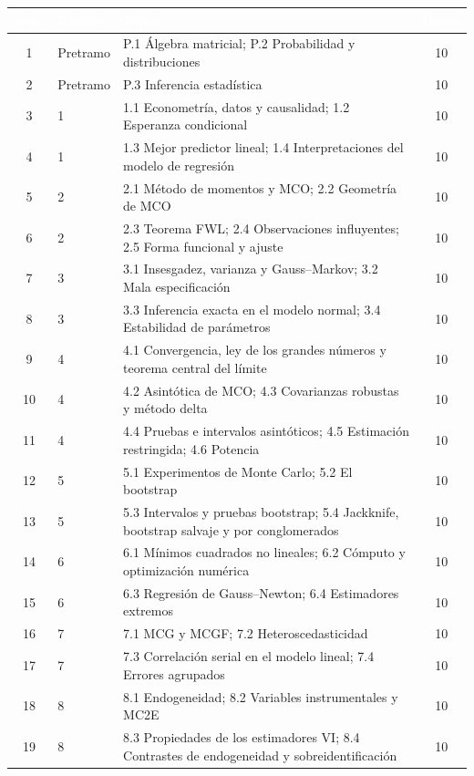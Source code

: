 \documentclass[11pt,a4paper]{article}
\renewcommand{\arraystretch}{1.3}
\newcommand{\cab}[1]{\textcolor{white}{\sffamily\bfseries #1}}
\newcommand{\filasalternas}{\rowcolors{2}{white}{tonoPalido}}
\begin{document}
{\small\filasalternas
\renewcommand{\arraystretch}{1.1}\noindent\begin{tabularx}{\textwidth}{clXc}
\toprule
\rowcolor{tonoOscuro}\cab{Sem.} & \cab{Bloque} & \cab{Temas} & \cab{Horas} \\
\midrule
1  & Pretramo & P.1 Álgebra matricial; P.2 Probabilidad y distribuciones & 10 \\
2  & Pretramo & P.3 Inferencia estadística & 10 \\
\midrule
3  & 1 & 1.1 Econometría, datos y causalidad; 1.2 Esperanza condicional & 10 \\
4  & 1 & 1.3 Mejor predictor lineal; 1.4 Interpretaciones del modelo de regresión & 10 \\
\midrule
5  & 2 & 2.1 Método de momentos y MCO; 2.2 Geometría de MCO & 10 \\
6  & 2 & 2.3 Teorema FWL; 2.4 Observaciones influyentes; 2.5 Forma funcional y ajuste & 10 \\
\midrule
7  & 3 & 3.1 Insesgadez, varianza y Gauss--Markov; 3.2 Mala especificación & 10 \\
8  & 3 & 3.3 Inferencia exacta en el modelo normal; 3.4 Estabilidad de parámetros & 10 \\
\midrule
9  & 4 & 4.1 Convergencia, ley de los grandes números y teorema central del límite & 10 \\
10 & 4 & 4.2 Asintótica de MCO; 4.3 Covarianzas robustas y método delta & 10 \\
11 & 4 & 4.4 Pruebas e intervalos asintóticos; 4.5 Estimación restringida; 4.6 Potencia & 10 \\
\midrule
12 & 5 & 5.1 Experimentos de Monte Carlo; 5.2 El bootstrap & 10 \\
13 & 5 & 5.3 Intervalos y pruebas bootstrap; 5.4 Jackknife, bootstrap salvaje y por conglomerados & 10 \\
\midrule
14 & 6 & 6.1 Mínimos cuadrados no lineales; 6.2 Cómputo y optimización numérica & 10 \\
15 & 6 & 6.3 Regresión de Gauss--Newton; 6.4 Estimadores extremos & 10 \\
\midrule
16 & 7 & 7.1 MCG y MCGF; 7.2 Heteroscedasticidad & 10 \\
17 & 7 & 7.3 Correlación serial en el modelo lineal; 7.4 Errores agrupados & 10 \\
\midrule
18 & 8 & 8.1 Endogeneidad; 8.2 Variables instrumentales y MC2E & 10 \\
19 & 8 & 8.3 Propiedades de los estimadores VI; 8.4 Contrastes de endogeneidad y sobreidentificación & 10 \\

\end{tabularx}}
\end{document}
